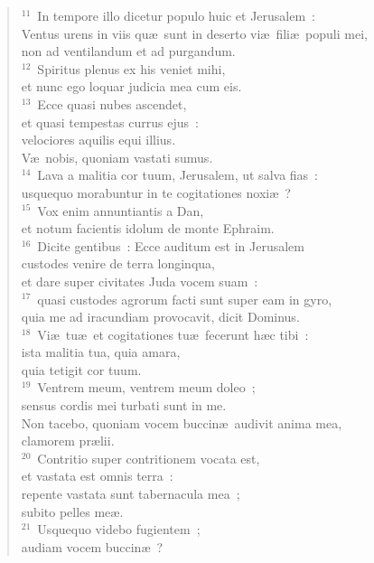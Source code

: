 \begin{verse}${}^{11}$~In tempore illo dicetur populo huic et Jerusalem~:\\ Ventus urens in viis qu\ae\ sunt in deserto vi\ae\ fili\ae\ populi mei,\\ non ad ventilandum et ad purgandum.\\
${}^{12}$~Spiritus plenus ex his veniet mihi,\\ et nunc ego loquar judicia mea cum eis.\\
${}^{13}$~Ecce quasi nubes ascendet,\\ et quasi tempestas currus ejus~:\\ velociores aquilis equi illius.\\ V\ae\ nobis, quoniam vastati sumus.\\
${}^{14}$~Lava a malitia cor tuum, Jerusalem, ut salva fias~:\\ usquequo morabuntur in te cogitationes noxi\ae~?\\
${}^{15}$~Vox enim annuntiantis a Dan,\\ et notum facientis idolum de monte Ephraim.\\
${}^{16}$~Dicite gentibus~: Ecce auditum est in Jerusalem\\ custodes venire de terra longinqua,\\ et dare super civitates Juda vocem suam~:\\
${}^{17}$~quasi custodes agrorum facti sunt super eam in gyro,\\ quia me ad iracundiam provocavit, dicit Dominus.\\
${}^{18}$~Vi\ae\ tu\ae\ et cogitationes tu\ae\ fecerunt h\ae c tibi~:\\ ista malitia tua, quia amara,\\ quia tetigit cor tuum.\\
${}^{19}$~Ventrem meum, ventrem meum doleo~;\\ sensus cordis mei turbati sunt in me.\\ Non tacebo, quoniam vocem buccin\ae\ audivit anima mea,\\ clamorem pr\ae lii.\\
${}^{20}$~Contritio super contritionem vocata est,\\ et vastata est omnis terra~:\\ repente vastata sunt tabernacula mea~;\\ subito pelles me\ae .\\
${}^{21}$~Usquequo videbo fugientem~;\\ audiam vocem buccin\ae~?\\

\end{verse}
